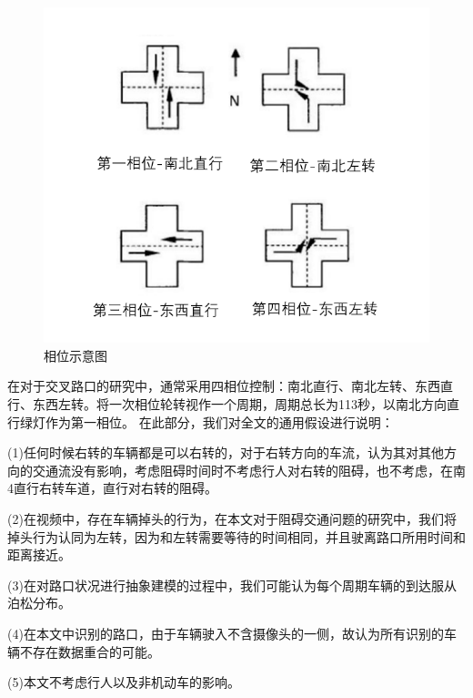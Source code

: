 \begin{figure}[h]
    \centering
    \includegraphics[scale=0.5]{figures/四相相位图.png}
    \caption{相位示意图}
    \label{fig:相位}
\end{figure}

在对于交叉路口的研究中，通常采用四相位控制：南北直行、南北左转、东西直行、东西左转。将一次相位轮转视作一个周期，周期总长为113秒，以南北方向直行绿灯作为第一相位。
在此部分，我们对全文的通用假设进行说明：

(1)任何时候右转的车辆都是可以右转的，对于右转方向的车流，认为其对其他方向的交通流没有影响，考虑阻碍时间时不考虑行人对右转的阻碍，也不考虑，在南4直行右转车道，直行对右转的阻碍。

(2)在视频中，存在车辆掉头的行为，在本文对于阻碍交通问题的研究中，我们将掉头行为认同为左转，因为和左转需要等待的时间相同，并且驶离路口所用时间和距离接近。

(3)在对路口状况进行抽象建模的过程中，我们可能认为每个周期车辆的到达服从泊松分布。

(4)在本文中识别的路口，由于车辆驶入不含摄像头的一侧，故认为所有识别的车辆不存在数据重合的可能。

(5)本文不考虑行人以及非机动车的影响。

